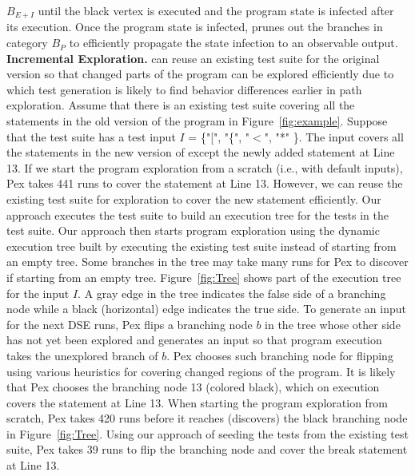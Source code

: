  $B_{E+I}$ until the black vertex is executed and the program state is infected after its execution.
 Once the program state is infected,  prunes out the branches in category $B_{P}$ to efficiently propagate the state infection to an observable output.
\\ \textbf{Incremental Exploration.}  can reuse an existing
test suite for the original version so that changed parts of the program can be explored
efficiently due to which test generation is likely to find behavior
differences earlier in path exploration. Assume that there is an existing test suite covering all the statements in the old version of the program in Figure~\ref{fig:example}. Suppose that the test suite has a test input $I$ = \{"[", "\{", "$<$", "*" \}. The input covers all the statements in the new version of  except the newly added  statement at Line 13. If we start the program exploration from a scratch (i.e., with default inputs), Pex takes 441 runs to cover the  statement at Line 13. However, we can reuse the existing test suite for exploration to cover the new statement efficiently. Our approach executes the test suite to build an execution tree for the tests in the test suite. Our approach then starts program exploration using the dynamic execution tree built by executing the existing test suite instead of starting from an empty tree. Some branches in the tree may take many runs for Pex to discover if starting from an empty tree. Figure~\ref{fig:Tree} shows part of the execution tree for the input $I$. A gray edge in the tree indicates the false side of a branching node while a black (horizontal) edge indicates the true side. To generate an input for the next DSE runs, Pex flips a branching node $b$ in the tree whose other side has not yet been explored and generates an input so that program execution takes the unexplored branch of $b$. Pex chooses such branching node for flipping using various heuristics for covering changed regions of the program. It is likely that Pex chooses the branching node 13 (colored black), which on execution covers the  statement at Line 13. When starting the program exploration from scratch, Pex takes 420 runs before it reaches (discovers) the black branching node in Figure~\ref{fig:Tree}. Using our approach of seeding the tests from the existing test suite, Pex takes 39 runs to flip the branching node and cover the break statement at Line 13.





